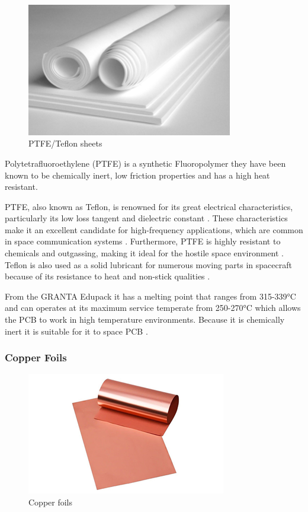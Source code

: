 \begin{figure}[htbp]
    \centering
    \includegraphics[width=9cm]{chapters/methodology/MaterialAnalysis/Fig3PTFE.png}
    \caption{PTFE/Teflon sheets \cite{RefWorks:imimg2025teflon/ptfe}}
    \label{fig:ptfe-sheets}
\end{figure}

Polytetrafluoroethylene (PTFE) is a synthetic Fluoropolymer they have been known to be chemically inert, low friction properties and has a high heat resistant.

PTFE, also known as Teflon, is renowned for its great electrical characteristics, particularly its low loss tangent and dielectric constant \cite{RefWorks:2025designing}. 
These characteristics make it an excellent candidate for high-frequency applications, which are common in space communication systems \cite{RefWorks:2025designing}. 
Furthermore, PTFE is highly resistant to chemicals and outgassing, making it ideal for the hostile space environment \cite{RefWorks:2025designing}. 
Teflon is also used as a solid lubricant for numerous moving parts in spacecraft because of its resistance to heat and non-stick qualities \cite{RefWorks:2023select}.

From the GRANTA Edupack it has a melting point that ranges from 315-339°C and can operates at its maximum service temperate from 250-270°C which allows the PCB to work in high temperature environments. 
Because it is chemically inert it is suitable for it to space PCB \cite{RayMingPCB2023}.

\subsubsection{Copper Foils}
\begin{figure}[htbp]
    \centering
    \includegraphics[width=8.7cm]{chapters/methodology/MaterialAnalysis/Fig4Copper.png}
    \caption{Copper foils \cite{RefWorks:solutions2022copper}}
    \label{fig:copper-foils}
\end{figure}


